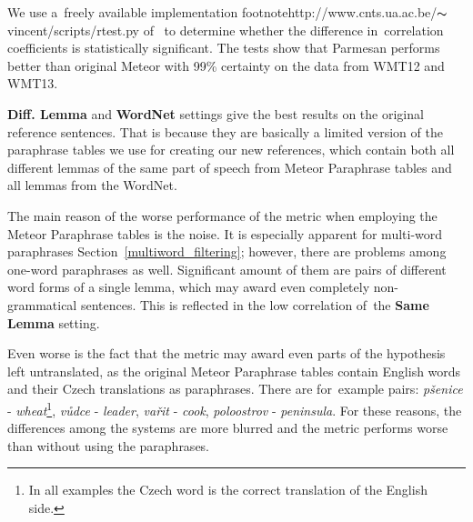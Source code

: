 \documentclass[11pt]{article}
\def\Sref#1{Section~\ref{#1}}
\begin{document}
We use a~freely available implementation footnote{http://www.cnts.ua.ac.be/$ \thicksim $vincent/scripts/rtest.py} 
of~ to determine whether the difference in~correlation 
coefficients is statistically significant. The tests show that Parmesan performs better than
original Meteor with 99\% certainty on the data from WMT12 and WMT13.

\textbf{Diff. Lemma} and \textbf{WordNet} settings give the best results on the original reference sentences. 
That is because they are basically a limited version of the paraphrase tables we use for creating our
new references, which contain both all different lemmas of the same part of speech from Meteor Paraphrase
tables and all lemmas from the WordNet.

The main reason of the worse performance of the metric when employing the Meteor Paraphrase tables is
the noise. It is especially apparent for multi-word paraphrases \Sref{multiword_filtering}; however, 
there  are problems among one-word paraphrases as well. Significant amount of them are pairs of different
word forms of a single lemma, which may award even completely non-grammatical sentences. This is reflected 
in the low correlation of~the \textbf{Same Lemma} setting.

Even worse is the fact that the metric may award even parts of the hypothesis left untranslated, 
as the original Meteor Paraphrase tables contain English words and their Czech translations as 
paraphrases. There are for~example pairs: \textit{pšenice} - \textit{wheat}\footnote{In all examples 
the Czech word is the correct translation of the English side.}, \textit{vůdce} - \textit{leader}, 
\textit{vařit} -	\textit{cook}, \textit{poloostrov} - \textit{peninsula}. For these reasons, 
the differences among the systems are more blurred and the metric performs worse than without using 
the paraphrases. 
\end{document}
